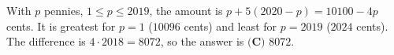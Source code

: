 With $p$ pennies, $1\le p\le2019$, the amount is $p+5(2020-p)=10100-4p$ cents. It is greatest for $p=1$ ($10096$ cents) and least for $p=2019$ ($2024$ cents). The difference is $4\cdot2018=8072$, so the answer is $\boxed{\textbf{(C) }8072}$.
